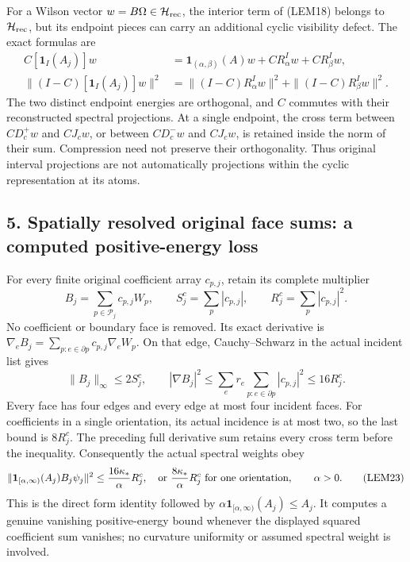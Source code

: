 \documentclass[11pt]{article}
\begin{document}
For a Wilson vector \(w=B\Omega\in\mathcal H_{\rm rec}\), the interior term of (LEM18) belongs to \(\mathcal H_{\rm rec}\), but its endpoint pieces can carry an additional cyclic visibility defect. The exact formulas are
\[
\begin{aligned}
 C[\mathbf1_I(A_j)]w
 &=\mathbf1_{(\alpha,\beta)}(A)w+CR_\alpha^Iw+CR_\beta^Iw,\\
 \|(I-C)[\mathbf1_I(A_j)]w\|^2
 &=\|(I-C)R_\alpha^Iw\|^2+\|(I-C)R_\beta^Iw\|^2.
\end{aligned}\tag{LEM20}
\]
The two distinct endpoint energies are orthogonal, and \(C\) commutes with their reconstructed spectral projections. At a single endpoint, the cross term between \(CD_c^+w\) and \(CJ_cw\), or between \(CD_c^-w\) and \(CJ_cw\), is retained inside the norm of their sum. Compression need not preserve their orthogonality. Thus original interval projections are not automatically projections within the cyclic representation at its atoms.

\subsection*{5. Spatially resolved original face sums: a computed positive-energy loss}

For every finite original coefficient array \(c_{p,j}\), retain its complete multiplier
\[
 B_j=\sum_{p\in\mathcal P_j}c_{p,j}W_p,\qquad
 S_j^c=\sum_p|c_{p,j}|,\qquad R_j^c=\sum_p|c_{p,j}|^2.
 \tag{LEM21}
\]
No coefficient or boundary face is removed. Its exact derivative is \(\nabla_eB_j=\sum_{p:e\in\partial p}c_{p,j}\nabla_eW_p\). On that edge, Cauchy–Schwarz in the actual incident list gives
\[
 \|B_j\|_\infty\le2S_j^c,\qquad
 |\nabla B_j|^2\le\sum_er_e\sum_{p:e\in\partial p}|c_{p,j}|^2
 \le16R_j^c.
 \tag{LEM22}
\]
Every face has four edges and every edge at most four incident faces. For coefficients in a single orientation, its actual incidence is at most two, so the last bound is \(8R_j^c\). The preceding full derivative sum retains every cross term before the inequality. Consequently the actual spectral weights obey
\[
 \|\mathbf1_{[\alpha,\infty)}(A_j)B_j\psi_j\|^2
 \le {16\kappa_*\over\alpha}R_j^c,
 \quad\hbox{or }{8\kappa_*\over\alpha}R_j^c
       \hbox{ for one orientation},\qquad\alpha>0.
 \tag{LEM23}
\]
This is the direct form identity followed by \(\alpha\mathbf1_{[\alpha,\infty)}(A_j)\le A_j\). It computes a genuine vanishing positive-energy bound whenever the displayed squared coefficient sum vanishes; no curvature uniformity or assumed spectral weight is involved.
\end{document}
